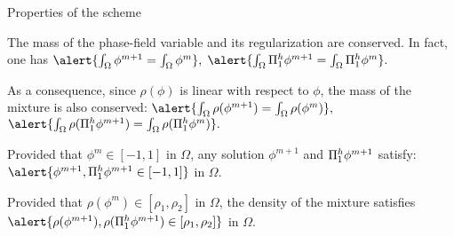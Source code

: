 \begin{frame}{Properties of the scheme}
  \fontsize{9}{11}
  \begin{proposition}
      The mass of the phase-field variable and its regularization are conserved. In fact, one has 
      $
      \alert{\int_\Omega\phi^{m+1}=\int_\Omega \phi^m},$ $\alert{\int_\Omega\Pih_1\phi^{m+1}=\int_\Omega \Pih_1\phi^m}.
      $
      
      \vspace{\baselineskip}
      As a consequence, since $\rho(\phi)$ is linear with respect to $\phi$, the mass of the mixture is also conserved: 
      $
     \alert{\int_\Omega \rho(\phi^{m+1})=\int_\Omega \rho(\phi^{m})},$ $\alert{\int_\Omega \rho(\Pih_1\phi^{m+1})=\int_\Omega \rho(\Pih_1\phi^{m})}.
     $
  \end{proposition}
  \pause
  \begin{theorem}
      \label{cha6:thm:discrete_maximum_principle}
      Provided that $\phi^m\in[-1,1]$ in $\Omega$, any solution $\phi^{m+1}$ and $\Pi^h_1\phi^{m+1}$ satisfy:
    $\alert{\phi^{m+1}, \Pih_1\phi^{m+1}\in[-1,1]}$ in $\Omega$.
  \end{theorem}
  \pause
  \begin{corollary}
      \label{cha6:cor:discrete_maximum_principle}
      Provided that $\rho(\phi^m)\in[\rho_1,\rho_2]$ in $\Omega$, the density of the mixture satisfies $\alert{\rho(\phi^{m+1}),\rho(\Pih_1\phi^{m+1})\in[\rho_1,\rho_2]}$ in $\Omega$.
  \end{corollary}
\end{frame}

